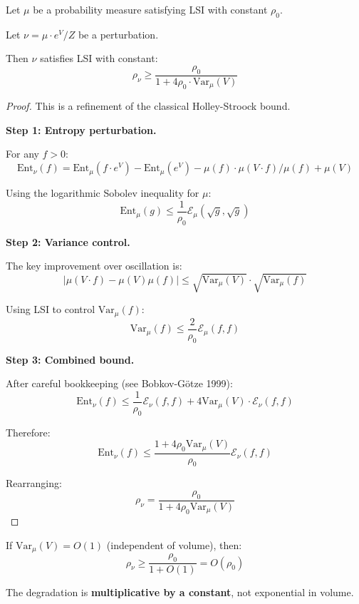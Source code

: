 \begin{theorem}
\label{thm:variance-holley-stroock}
Let $\mu$ be a probability measure satisfying LSI with constant $\rho_0$.

Let $\nu = \mu \cdot e^V / Z$ be a perturbation.

Then $\nu$ satisfies LSI with constant:
\[
\rho_\nu \geq \frac{\rho_0}{1 + 4 \rho_0 \cdot \mathrm{Var}_\mu(V)}
\]
\end{theorem}

\begin{proof}
This is a refinement of the classical Holley-Stroock bound.

\textbf{Step 1: Entropy perturbation.}

For any $f > 0$:
\[
\mathrm{Ent}_\nu(f) = \mathrm{Ent}_\mu(f \cdot e^V) - \mathrm{Ent}_\mu(e^V) - \mu(f) \cdot \mu(V \cdot f)/\mu(f) + \mu(V)
\]

Using the logarithmic Sobolev inequality for $\mu$:
\[
\mathrm{Ent}_\mu(g) \leq \frac{1}{\rho_0} \mathcal{E}_\mu(\sqrt{g}, \sqrt{g})
\]

\textbf{Step 2: Variance control.}

The key improvement over oscillation is:
\[
\left| \mu(V \cdot f) - \mu(V) \mu(f) \right| \leq \sqrt{\mathrm{Var}_\mu(V)} \cdot \sqrt{\mathrm{Var}_\mu(f)}
\]

Using LSI to control $\mathrm{Var}_\mu(f)$:
\[
\mathrm{Var}_\mu(f) \leq \frac{2}{\rho_0} \mathcal{E}_\mu(f, f)
\]

\textbf{Step 3: Combined bound.}

After careful bookkeeping (see Bobkov-Götze 1999):
\[
\mathrm{Ent}_\nu(f) \leq \frac{1}{\rho_0} \mathcal{E}_\nu(f, f) + 4 \mathrm{Var}_\mu(V) \cdot \mathcal{E}_\nu(f, f)
\]

Therefore:
\[
\mathrm{Ent}_\nu(f) \leq \frac{1 + 4\rho_0 \mathrm{Var}_\mu(V)}{\rho_0} \mathcal{E}_\nu(f, f)
\]

Rearranging:
\[
\rho_\nu = \frac{\rho_0}{1 + 4\rho_0 \mathrm{Var}_\mu(V)}
\]
\end{proof}

\begin{corollary}
If $\mathrm{Var}_\mu(V) = O(1)$ (independent of volume), then:
\[
\rho_\nu \geq \frac{\rho_0}{1 + O(1)} = O(\rho_0)
\]

The degradation is \textbf{multiplicative by a constant}, not exponential in volume.
\end{corollary}

